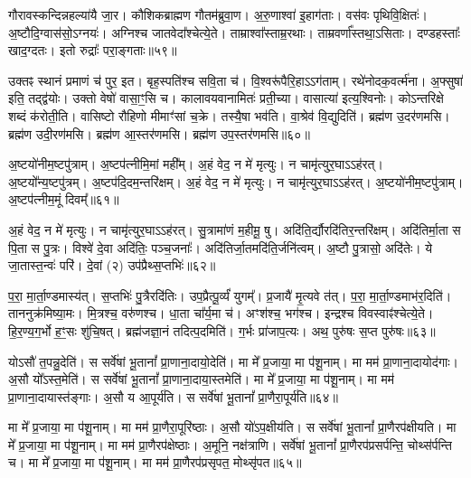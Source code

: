 गौरावस्कन्दिन्नहल्या॑यै जा॒र। कौशिकब्राह्मण गौतम॑ब्रुवा॒ण। 
अ॒रु॒णाश्वा॑ इ॒हाग॑ताः। वस॑वः पृथिवि॒क्षितः॑। 
अ॒ष्टौदि॒ग्वास॑सो॒\-ऽग्नयः॑। अग्निश्च जात\-वेदा᳚श्चेत्ये॒ते। 
ताम्राश्वा᳚स्ताम्र॒रथाः। ताम्रवर्णा᳚स्तथा॒\-ऽसिताः। 
दण्डहस्ताः᳚ खाद॒ग्दतः। इतो रुद्राः᳚ परा॒ङ्गताः॥५९॥


उक्तꣴ स्थानं प्रमाणं च॑ पुर॒ इत। बृह॒स्पति॑श्च सवि॒ता च॑। 
वि॒श्वरू॑पैरि॒हा\-ऽऽग॑ताम्। रथे॑नोदक॒वर्त्म॑ना। 
अ॒फ्सुषा॑ इति॒ तद्द्व॑योः। उक्तो वेषो॑ वासा॒ꣳ॒सि च। 
कालावयवानामितः॑ प्रती॒च्या। वासात्या॑ इत्य॒श्विनोः। 
कोऽन्तरिक्षे शब्दं क॑रोती॒ति। वासिष्टो रौहिणो मीमाꣳ॑सां च॒क्रे। 
तस्यै॒षा भव॑ति। वा॒श्रेव॑ वि॒द्युदिति॑। 
ब्रह्म॑ण उ॒दर॑णमसि। ब्रह्म॑ण उदी॒रण॑मसि। 
ब्रह्म॑ण आ॒स्तर॑णमसि। ब्रह्म॑ण उप॒स्तर॑णमसि॥६०॥\anuvakamend


\noindent [अप॑क्रामत गर्भि॒ण्यः॑]

अ॒ष्टयो॑नीम॒ष्टपु॑त्राम्। अ॒ष्टप॑त्नीमि॒मां मही᳚म्। 
अ॒हं वेद॒ न मे॑ मृत्युः। न चामृ॑त्युर॒घाऽऽह॑रत्। 
अ॒ष्टयो᳚न्य॒ष्टपु॑त्रम्। अ॒ष्टप॑दि॒दम॒न्तरि॑क्षम्। 
अ॒हं वेद॒ न मे॑ मृत्युः। न चामृ॑त्युर॒घाऽऽह॑रत्। 
अ॒ष्टयो॑नीम॒ष्टपु॑त्राम्। अ॒ष्टप॑त्नीम॒मूं दिवम्‌᳚॥६१॥


अ॒हं वेद॒ न मे॑ मृत्युः। न चामृ॑त्युर॒घाऽऽह॑रत्। 
सु॒त्रामा॑णं म॒हीमू॒ षु। अदि॑ति॒र्द्यौरदि॑तिर॒न्तरि॑क्षम्। 
अदि॑तिर्मा॒ता स पि॒ता स पु॒त्रः। विश्वे॑ दे॒वा अदि॑तिः॒ पञ्च\-॒जनाः᳚। 
अदि॑तिर्जा॒तमदि॑ति॒र्जनि॑त्वम्। अ॒ष्टौ पु॒त्रासो॒ अदि॑तेः। 
ये जा॒तास्त॒न्वः॑ परि॑। दे॒वां (२) उप॑प्रैथ्स॒प्तभिः॑॥६२॥


प॒रा॒ मा॒र्ता॒ण्डमास्य॑त्। स॒प्तभिः॑ पु॒त्रैरदि॑तिः। 
उप॒प्रैत्पू॒र्व्यं॑ युगम्᳚। प्र॒जायै॑ मृ॒त्यवे त॑त्। 
प॒रा॒ मा॒र्ता॒ण्डमाभ॑र॒दिति॑। ताननुक्र॑मिष्या॒मः। 
मि॒त्रश्च॒ वरु॑णश्च। धा॒ता चा᳚र्य॒मा च॑। 
अꣳश॑श्च॒ भग॑श्च। इन्द्रश्च विवस्वाꣴ॑श्चेत्ये॒ते। 
हि॒र॒ण्य॒ग॒र्भो ह॒ꣳ॒सः शु॑चि॒षत्। 
ब्रह्म॑जज्ञा॒नं तदित्प॒दमिति॑। ग॒र्भः प्रा॑जाप॒त्यः। 
अथ॒ पुरु॑षः स॒प्त पुरु॑षः॥६३॥

\noindent[य॒था॒स्था॒नं ग॑र्भि॒ण्यः॑]\anuvakamend

योऽसौ॑ त॒पन्नु॒देति॑। स सर्वे॑षां भू॒तानां᳚ प्रा॒णाना॒दायो॒देति॑। 
मा मे᳚ प्र॒जाया॒ मा प॑शू॒नाम्। मा मम॑ प्रा॒णाना॒दायोद॑गाः। 
अ॒सौ यो᳚ऽस्त॒मेति॑। स सर्वे॑षां भू॒तानां᳚ प्रा॒णाना॒दाया॒स्तमेति॑। 
मा मे᳚ प्र॒जाया॒ मा प॑शू॒नाम्। मा मम॑ प्रा॒णाना॒दायास्त॑ङ्गाः। 
अ॒सौ य आ॒पूर्य॑ति। स सर्वे॑षां भू॒तानां᳚ प्रा॒णैरा॒पूर्य॑ति॥६४॥


मा मे᳚ प्र॒जाया॒ मा प॑शू॒नाम्। मा मम॑ प्रा॒णैरा॒पूरि॑ष्ठाः। 
अ॒सौ यो॑ऽप॒क्षीय॑ति। स सर्वे॑षां भू॒तानां᳚ प्रा॒णैरप॑क्षीयति। 
मा मे᳚ प्र॒जाया॒ मा प॑शू॒नाम्। मा मम॑ प्रा॒णैरप॑क्षेष्ठाः। 
अ॒मूनि॒ नक्ष॑त्राणि। सर्वे॑षां भू॒तानां᳚ प्रा॒णैरप॑प्रसर्पन्ति॒ चोथ्स॑र्पन्ति च। 
मा मे᳚ प्र॒जाया॒ मा प॑शू॒नाम्। मा मम॑ प्रा॒णैरप॑प्रसृपत॒ मोथ्सृ॑पत॥६५॥


